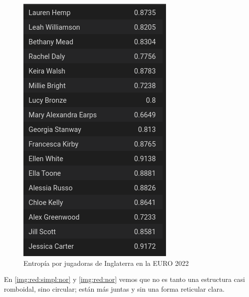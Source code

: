 \begin{figure}[ht!]
  \centering
   \includegraphics[width=\textwidth]{./img/entrop_engl.png}
   \caption{Entropía por jugadoras de Inglaterra en la EURO 2022}
   \label{img:red:eng}
\end{figure}

En \ref{img:red:simpl:nor} y \ref{img:red:nor} vemos que no es tanto una estructura casi romboidal, sino circular; 
están más juntas y sin una forma reticular clara.

